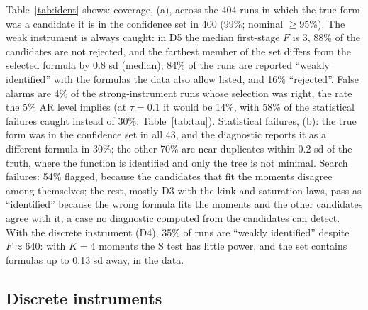 \begin{table}[ht]
\centering\small
\caption{The identification diagnostic on the 630 breadth-grid runs.}
\label{tab:ident}
\end{table}

Table~\ref{tab:ident} shows: coverage, (a), across the 404 runs in which the true form was a candidate it is in the confidence set in 400 (99\%; nominal $\ge 95\%$). The weak instrument is always caught: in D5 the median first-stage $F$ is 3, 88\% of the candidates are not rejected, and the farthest member of the set differs from the selected formula by 0.8 sd (median); 84\% of the runs are reported ``weakly identified'' with the formulas the data also allow listed, and 16\% ``rejected''. False alarms are 4\% of the strong-instrument runs whose selection was right, the rate the 5\% AR level implies (at $\tau = 0.1$ it would be 14\%, with 58\% of the statistical failures caught instead of 30\%; Table~\ref{tab:tau}). Statistical failures, (b): the true form was in the confidence set in all 43, and the diagnostic reports it as a different formula in 30\%; the other 70\% are near-duplicates within 0.2 sd of the truth, where the function is identified and only the tree is not minimal. Search failures: 54\% flagged, because the candidates that fit the moments disagree among themselves; the rest, mostly D3 with the kink and saturation laws, pass as ``identified'' because the wrong formula fits the moments and the other candidates agree with it, a case no diagnostic computed from the candidates can detect. With the discrete instrument (D4), 35\% of runs are ``weakly identified'' despite $F \approx 640$: with $K = 4$ moments the S test has little power, and the set contains formulas up to 0.13 sd away,  in the data.

\subsection{Discrete instruments}
\label{sec:mc-discrete}

